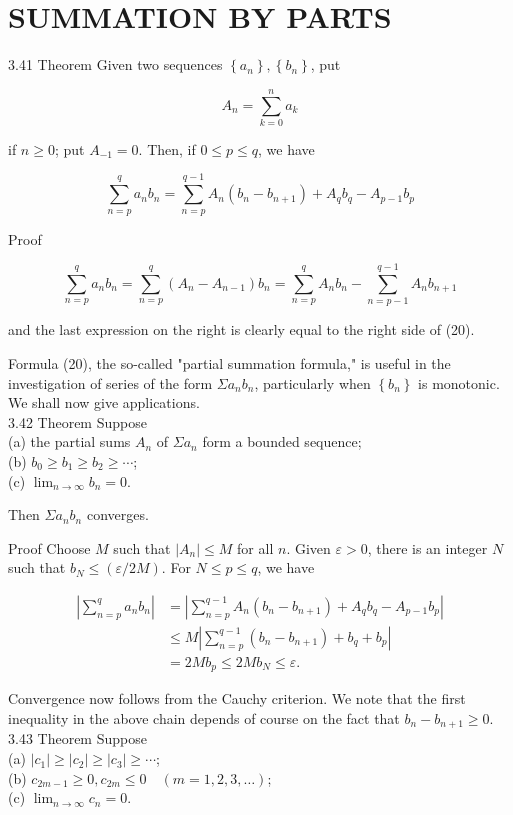 \documentclass[10pt]{article}
\begin{document}
\section*{SUMMATION BY PARTS}
3.41 Theorem Given two sequences $\left\{a_{n}\right\},\left\{b_{n}\right\}$, put

$$
A_{n}=\sum_{k=0}^{n} a_{k}
$$

if $n \geq 0$; put $A_{-1}=0$. Then, if $0 \leq p \leq q$, we have


\begin{equation*}
\sum_{n=p}^{q} a_{n} b_{n}=\sum_{n=p}^{q-1} A_{n}\left(b_{n}-b_{n+1}\right)+A_{q} b_{q}-A_{p-1} b_{p} \tag{20}
\end{equation*}


Proof

$$
\sum_{n=p}^{q} a_{n} b_{n}=\sum_{n=p}^{q}\left(A_{n}-A_{n-1}\right) b_{n}=\sum_{n=p}^{q} A_{n} b_{n}-\sum_{n=p-1}^{q-1} A_{n} b_{n+1}
$$

and the last expression on the right is clearly equal to the right side of (20).

Formula (20), the so-called "partial summation formula," is useful in the investigation of series of the form $\Sigma a_{n} b_{n}$, particularly when $\left\{b_{n}\right\}$ is monotonic. We shall now give applications.\\
3.42 Theorem Suppose\\
(a) the partial sums $A_{n}$ of $\Sigma a_{n}$ form a bounded sequence;\\
(b) $b_{0} \geq b_{1} \geq b_{2} \geq \cdots$;\\
(c) $\lim _{n \rightarrow \infty} b_{n}=0$.

Then $\Sigma a_{n} b_{n}$ converges.

Proof Choose $M$ such that $\left|A_{n}\right| \leq M$ for all $n$. Given $\varepsilon>0$, there is an integer $N$ such that $b_{N} \leq(\varepsilon / 2 M)$. For $N \leq p \leq q$, we have

$$
\begin{aligned}
\left|\sum_{n=p}^{q} a_{n} b_{n}\right| & =\left|\sum_{n=p}^{q-1} A_{n}\left(b_{n}-b_{n+1}\right)+A_{q} b_{q}-A_{p-1} b_{p}\right| \\
& \leq M\left|\sum_{n=p}^{q-1}\left(b_{n}-b_{n+1}\right)+b_{q}+b_{p}\right| \\
& =2 M b_{p} \leq 2 M b_{N} \leq \varepsilon .
\end{aligned}
$$

Convergence now follows from the Cauchy criterion. We note that the first inequality in the above chain depends of course on the fact that $b_{n}-b_{n+1} \geq 0$.\\
3.43 Theorem Suppose\\
(a) $\left|c_{1}\right| \geq\left|c_{2}\right| \geq\left|c_{3}\right| \geq \cdots$;\\
(b) $c_{2 m-1} \geq 0, c_{2 m} \leq 0 \quad(m=1,2,3, \ldots)$;\\
(c) $\lim _{n \rightarrow \infty} c_{n}=0$.
\end{document}
